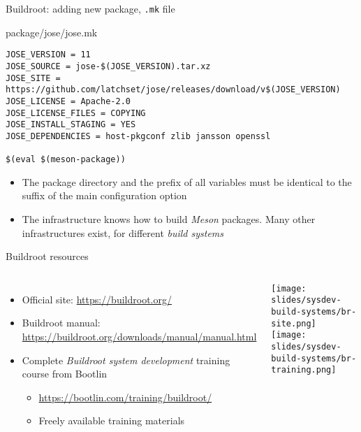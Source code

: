 \begin{frame}[fragile]{Buildroot: adding new package, {\tt .mk} file}
  \begin{block}{package/jose/jose.mk}
    {\scriptsize
\begin{verbatim}
JOSE_VERSION = 11
JOSE_SOURCE = jose-$(JOSE_VERSION).tar.xz
JOSE_SITE = https://github.com/latchset/jose/releases/download/v$(JOSE_VERSION)
JOSE_LICENSE = Apache-2.0
JOSE_LICENSE_FILES = COPYING
JOSE_INSTALL_STAGING = YES
JOSE_DEPENDENCIES = host-pkgconf zlib jansson openssl

$(eval $(meson-package))
\end{verbatim}
      }
    \end{block}
    \begin{itemize}
    \item The package directory and the prefix of all variables must be
      identical to the suffix of the main configuration option
    \item The  infrastructure knows how to build {\em
        Meson} packages. Many other infrastructures exist, for
      different {\em build systems}
    \end{itemize}
\end{frame}

\begin{frame}{Buildroot resources}
  \begin{columns}
    \begin{itemize}
    \item Official site: \url{https://buildroot.org/}
    \item Buildroot manual: \url{https://buildroot.org/downloads/manual/manual.html}
    \item Complete {\em Buildroot system development} training course
      from Bootlin
      \begin{itemize}
      \item \url{https://bootlin.com/training/buildroot/}
      \item Freely available training materials
      \end{itemize}
    \end{itemize}
    \begin{center}
      \texttt{[image: slides/sysdev-build-systems/br-site.png]}\\
      \texttt{[image: slides/sysdev-build-systems/br-training.png]}
    \end{center}
  \end{columns}
\end{frame}

